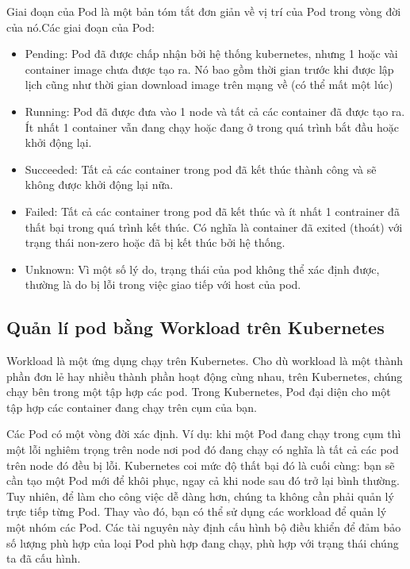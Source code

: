\documentclass[12pt,a4paper]{report}
\begin{document}
				Giai đoạn của Pod là một bản tóm tắt đơn giản về vị trí của Pod trong vòng đời của nó.Các giai đoạn của Pod:
				\begin{itemize}				
					\item Pending: Pod đã được chấp nhận bởi hệ thống kubernetes, nhưng 1 hoặc vài container image chưa được tạo ra. Nó bao gồm thời gian trước khi được lập lịch cũng như thời gian download image trên mạng về (có thể mất một lúc)
					\item Running: Pod đã được đưa vào 1 node và tất cả các container đã được tạo ra. Ít nhất 1 container vẫn đang chạy hoặc đang ở trong quá trình bắt đầu hoặc khởi động lại.
					\item  Succeeded: Tất cả các container trong pod đã kết thúc thành công và sẽ không được khởi động lại nữa.
					\item  Failed: Tất cả các container trong pod đã kết thúc và ít nhất 1 contrainer đã thất bại trong quá trình kết thúc. Có nghĩa là container đã exited (thoát) với trạng thái non-zero hoặc đã bị kết thúc bởi hệ thống.
					\item  Unknown: Vì một số lý do, trạng thái của pod không thể xác định được, thường là do bị lỗi trong việc giao tiếp với host của pod.
				\end{itemize}
			\subsection{Quản lí pod bằng Workload trên Kubernetes}
				{\hspace{0.6cm}Workload là một ứng dụng chạy trên Kubernetes. Cho dù workload là một thành phần đơn lẻ hay nhiều thành phần hoạt động cùng nhau, trên Kubernetes, chúng chạy bên trong một tập hợp các pod. Trong Kubernetes, Pod đại diện cho một tập hợp các container đang chạy trên cụm của bạn.\\}
				
				Các Pod có một vòng đời xác định. Ví dụ: khi một Pod đang chạy trong cụm thì một lỗi nghiêm trọng trên node nơi pod đó đang chạy có nghĩa là tất cả các pod trên node đó đều bị lỗi. Kubernetes coi mức độ thất bại đó là cuối cùng: bạn sẽ cần tạo một Pod mới để khôi phục, ngay cả khi node sau đó trở lại bình thường.\\
				
				Tuy nhiên, để làm cho công việc dễ dàng hơn, chúng ta không cần phải quản lý trực tiếp từng Pod. Thay vào đó, bạn có thể sử dụng các workload để quản lý một nhóm các Pod. Các tài nguyên này định cấu hình bộ điều khiển để đảm bảo số lượng phù hợp của loại Pod phù hợp đang chạy, phù hợp với trạng thái chúng ta đã cấu hình.\\
				
\end{document}
